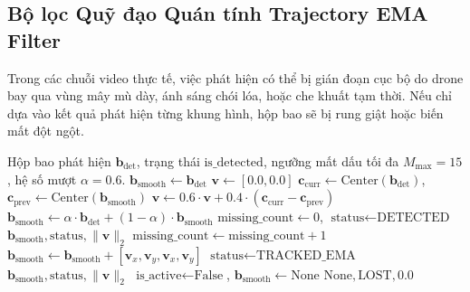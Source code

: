 \documentclass[11pt,a4paper]{article}
\begin{document}
\subsection{Bộ lọc Quỹ đạo Quán tính Trajectory EMA Filter}
Trong các chuỗi video thực tế, việc phát hiện có thể bị gián đoạn cục bộ do drone bay qua vùng mây mù dày, ánh sáng chói lóa, hoặc che khuất tạm thời. Nếu chỉ dựa vào kết quả phát hiện từng khung hình, hộp bao sẽ bị rung giật hoặc biến mất đột ngột.

\begin{algorithm}[H]
\caption{Thuật toán Lọc Quỹ đạo Quán tính Trajectory EMA}
\label{alg:trajectory_ema}
\begin{algorithmic}[1]
\REQUIRE Hộp bao phát hiện $\mathbf{b}_{\text{det}}$, trạng thái $\text{is\_detected}$, ngưỡng mất dấu tối đa $M_{\max} = 15$, hệ số mượt $\alpha = 0.6$.
        \STATE $\mathbf{b}_{\text{smooth}} \leftarrow \mathbf{b}_{\text{det}}$
        \STATE $\mathbf{v} \leftarrow [0.0, 0.0]$
    \ELSE
        \STATE $\mathbf{c}_{\text{curr}} \leftarrow \text{Center}(\mathbf{b}_{\text{det}})$, $\mathbf{c}_{\text{prev}} \leftarrow \text{Center}(\mathbf{b}_{\text{smooth}})$
        \STATE $\mathbf{v} \leftarrow 0.6 \cdot \mathbf{v} + 0.4 \cdot (\mathbf{c}_{\text{curr}} - \mathbf{c}_{\text{prev}})$ 
        \STATE $\mathbf{b}_{\text{smooth}} \leftarrow \alpha \cdot \mathbf{b}_{\text{det}} + (1 - \alpha) \cdot \mathbf{b}_{\text{smooth}}$ 
    \ENDIF
    \STATE $\text{missing\_count} \leftarrow 0$, $\text{status} \leftarrow \text{DETECTED}$
    \RETURN $\mathbf{b}_{\text{smooth}}, \text{status}, \|\mathbf{v}\|_2$
\ELSE
        \STATE $\text{missing\_count} \leftarrow \text{missing\_count} + 1$
        \STATE $\mathbf{b}_{\text{smooth}} \leftarrow \mathbf{b}_{\text{smooth}} + [\mathbf{v}_x, \mathbf{v}_y, \mathbf{v}_x, \mathbf{v}_y]$ 
        \STATE $\text{status} \leftarrow \text{TRACKED\_EMA}$
        \RETURN $\mathbf{b}_{\text{smooth}}, \text{status}, \|\mathbf{v}\|_2$
    \ELSE
        \STATE $\text{is\_active} \leftarrow \text{False}$, $\mathbf{b}_{\text{smooth}} \leftarrow \text{None}$
        \RETURN $\text{None}, \text{LOST}, 0.0$
    \ENDIF
\ENDIF
\end{algorithmic}
\end{algorithm}
\end{document}
